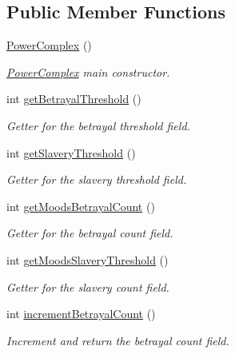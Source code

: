 \subsection*{Public Member Functions}
\begin{DoxyCompactItemize}
\item 
\hyperlink{classgameplay_1_1ai_1_1mood_1_1_power_complex_af124b7fecd7a7d29672520757ddd8169}{Power\-Complex} ()
\begin{DoxyCompactList}\small\item\em \hyperlink{classgameplay_1_1ai_1_1mood_1_1_power_complex}{Power\-Complex} main constructor. \end{DoxyCompactList}\item 
int \hyperlink{classgameplay_1_1ai_1_1mood_1_1_mood_a766902de5008b4ff54729075fe0b66a6}{get\-Betrayal\-Threshold} ()
\begin{DoxyCompactList}\small\item\em Getter for the betrayal threshold field. \end{DoxyCompactList}\item 
int \hyperlink{classgameplay_1_1ai_1_1mood_1_1_mood_a8c5dda351cf131a2e2a30a1570e2c7e7}{get\-Slavery\-Threshold} ()
\begin{DoxyCompactList}\small\item\em Getter for the slavery threshold field. \end{DoxyCompactList}\item 
int \hyperlink{classgameplay_1_1ai_1_1mood_1_1_mood_aae8ae123bc9d3bae48e08ad15528aa5b}{get\-Moods\-Betrayal\-Count} ()
\begin{DoxyCompactList}\small\item\em Getter for the betrayal count field. \end{DoxyCompactList}\item 
int \hyperlink{classgameplay_1_1ai_1_1mood_1_1_mood_a859eb2f9bae00ce3604d0fea5a690900}{get\-Moods\-Slavery\-Threshold} ()
\begin{DoxyCompactList}\small\item\em Getter for the slavery count field. \end{DoxyCompactList}\item 
int \hyperlink{classgameplay_1_1ai_1_1mood_1_1_mood_a322adb08d4a6f7dcd0eb00c77649d2d2}{increment\-Betrayal\-Count} ()
\begin{DoxyCompactList}\small\item\em Increment and return the betrayal count field. \end{DoxyCompactList}\item 

\end{DoxyCompactItemize}
